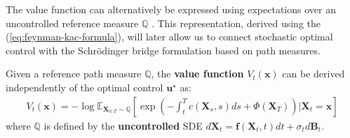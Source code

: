\documentclass{article}
\begin{document}
The value function can alternatively be expressed using expectations over an uncontrolled reference measure $\mathbb{Q}$ \citep{kappen2012optimal, domingo2024stochastic}. This representation, derived using the (\ref{eq:feynman-kac-formula}), will later allow us to connect stochastic optimal control with the Schrödinger bridge formulation based on path measures.

\begin{proposition}\label{prop:feynman-kac}
    Given a reference path measure $\mathbb{Q}$, the \textbf{value function} $V_t(\boldsymbol{x})$ can be derived independently of the optimal control $\boldsymbol{u}^\star$ as:
    \begin{align}
        V_t(\boldsymbol{x})=-\log \mathbb{E}_{\boldsymbol{X}_{0:T}\sim \mathbb{Q}}\left[\exp \left(-\int_t^Tc(\boldsymbol{X}_s,s)ds+\Phi(\boldsymbol{X}_T)\right)\bigg|\boldsymbol{X}_t=\boldsymbol{x}\right]
    \end{align}
    where $\mathbb{Q}$ is defined by the \textbf{uncontrolled} SDE $d\boldsymbol{X}_t=\boldsymbol{f}(\boldsymbol{X}_t,t)dt +\sigma_td\boldsymbol{B}_t$.
\end{proposition}
\end{document}
